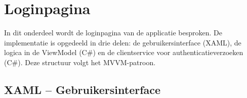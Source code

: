 
\section{Loginpagina}

In dit onderdeel wordt de loginpagina van de applicatie besproken. De implementatie is opgedeeld in drie delen: de gebruikersinterface (XAML), de logica in de ViewModel (C\#) en de clientservice voor authenticatieverzoeken (C\#). Deze structuur volgt het MVVM-patroon.

\subsection{XAML – Gebruikersinterface}

